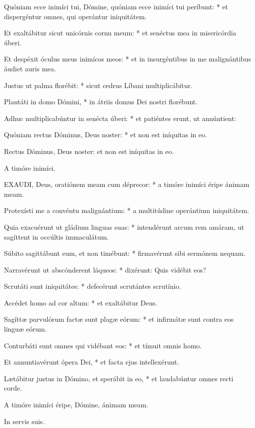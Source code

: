 Quóniam ecce inimíci tui, Dómine, quóniam ecce inimíci tui períbunt: * et dispergéntur omnes, qui operántur iniquitátem.

Et exaltábitur sicut unicórnis cornu meum: * et senéctus mea in misericórdia úberi.

Et despéxit óculus meus inimícos meos: * et in insurgéntibus in me malignántibus áudiet auris mea.

Justus ut palma florébit: * sicut cedrus Líbani multiplicábitur.

Plantáti in domo Dómini, * in átriis domus Dei nostri florébunt.

Adhuc multiplicabúntur in senécta úberi: * et patiéntes erunt, ut annúntient:

Quóniam rectus Dóminus, Deus noster: * et non est iníquitas in eo.

 Rectus Dóminus, Deus noster: et non est iníquitas in eo.

 A timóre inimíci.


\lettrine[lines=2]{E}{XAUDI}, Deus, oratiónem meam cum déprecor: * a timóre inimíci éripe ánimam meam.

Protexísti me a convéntu malignántium: * a multitúdine operántium iniquitátem.

Quia exacuérunt ut gládium linguas suas: * intendérunt arcum rem amáram, ut sagíttent in occúltis immaculátum.

Súbito sagittábunt eum, et non timébunt: * firmavérunt sibi sermónem nequam.

Narravérunt ut abscónderent láqueos: * dixérunt: Quis vidébit eos?

Scrutáti sunt iniquitátes: * defecérunt scrutántes scrutínio.

Accédet homo ad cor altum: * et exaltábitur Deus.

Sagíttæ parvulórum factæ sunt plagæ eórum: * et infirmátæ sunt contra eos linguæ eórum.

Conturbáti sunt omnes qui vidébant eos: * et tímuit omnis homo.

Et annuntiavérunt ópera Dei, * et facta ejus intellexérunt.

Lætábitur justus in Dómino, et sperábit in eo, * et laudabúntur omnes recti corde.

 A timóre inimíci éripe, Dómine, ánimam meam.

 In servis suis.


